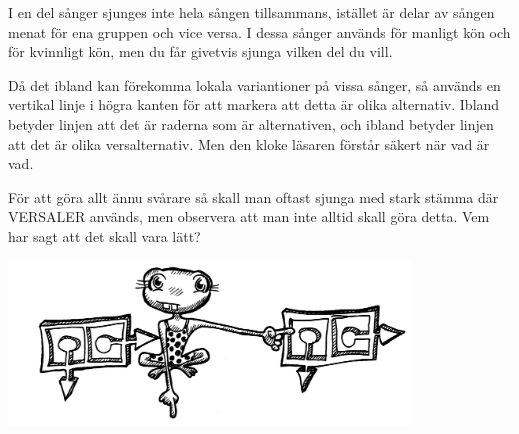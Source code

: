 \documentclass[a6paper,fontsize=10pt,twoside,open=right]{scrbook}
\makeatletter
\def\cleardoublepage{%
  \ifodd\c@page%
  \else%
    \ohead{}%
    \null%
    \newpage%
  \fi%
}%
\makeatother
\begin{document}
I en del sånger sjunges inte hela sången tillsammans,
istället är delar av sången menat för ena gruppen och vice versa. I
dessa sånger används {\Large\Male} för manligt kön och {\Large\Female}
för kvinnligt kön, men du får givetvis sjunga vilken del du vill.

\begin{leftborder}
  \hspace{15pt}Då det ibland kan förekomma lokala variantioner på vissa sånger, så
  används en  vertikal linje i högra kanten för att markera att detta
  är olika alternativ. Ibland betyder linjen att det är raderna som är
  alternativen, och ibland betyder linjen att det är olika
  versalternativ. Men den kloke läsaren förstår säkert när vad är vad.
\end{leftborder}

För att göra allt ännu svårare så skall man oftast sjunga med stark
stämma där VERSALER används, men observera att man inte alltid skall
göra detta. Vem har sagt att det skall vara lätt?
\newpage
\cleardoublepage
\renewcommand{\contentsname}{\vspace{-2.17cm}\rmfamily{\fontsize{13}{15}\textbf{INNEHÅLL}}\vspace{45pt}}
\tableofcontents\par
\begin{center}
  \vspace*{-300pt}
  \noindent\includegraphics[keepaspectratio,width=0.8\textwidth]{elements/groda.jpg}
\end{center}
\renewcommand{\leftmark}{}
\end{document}
